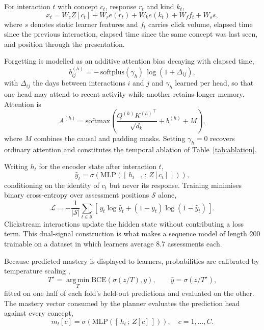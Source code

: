 \documentclass[conference]{IEEEtran}
\begin{document}
For interaction $t$ with concept $c_t$, response $r_t$ and kind $k_t$,
%
\begin{equation}
x_t = W_c Z[c_t] + W_r e(r_t) + W_k e(k_t) + W_f f_t + W_s s,
\label{eq:embedding}
\end{equation}
%
where $s$ denotes static learner features and $f_t$ carries click volume, elapsed time
since the previous interaction, elapsed time since the same concept was last seen, and
position through the presentation.

Forgetting is modelled as an additive attention bias decaying with elapsed time,
%
\begin{equation}
b^{(h)}_{ij} = -\,\mathrm{softplus}(\gamma_h)\,\log(1 + \Delta_{ij}),
\label{eq:decay}
\end{equation}
%
with $\Delta_{ij}$ the days between interactions $i$ and $j$ and $\gamma_h$ learned per
head, so that one head may attend to recent activity while another retains longer
memory. Attention is
%
\begin{equation}
A^{(h)} = \mathrm{softmax}\!\left(\frac{Q^{(h)}{K^{(h)}}^{\top}}{\sqrt{d_k}} + b^{(h)} + M\right),
\label{eq:attention}
\end{equation}
%
where $M$ combines the causal and padding masks. Setting $\gamma_h = 0$ recovers ordinary
attention and constitutes the temporal ablation of Table~\ref{tab:ablation}.

Writing $h_t$ for the encoder state after interaction $t$,
%
\begin{equation}
\hat{y}_t = \sigma\!\left(\mathrm{MLP}\!\left([\,h_{t-1}\,;\,Z[c_t]\,]\right)\right),
\label{eq:prediction}
\end{equation}
%
conditioning on the identity of $c_t$ but never its response. Training minimises binary
cross-entropy over assessment positions $\mathcal{S}$ alone,
%
\begin{equation}
\mathcal{L} = -\frac{1}{|\mathcal{S}|}\sum_{t \in \mathcal{S}} \left[\, y_t \log \hat{y}_t + (1 - y_t)\log(1 - \hat{y}_t)\,\right].
\label{eq:loss}
\end{equation}
%
Clickstream interactions update the hidden state without contributing a loss term. This
dual-signal construction is what makes a sequence model of length 200 trainable on a
dataset in which learners average 8.7 assessments each.

Because predicted mastery is displayed to learners, probabilities are calibrated by
temperature scaling \cite{guo2017calibration},
%
\begin{equation}
T^\star = \operatorname*{arg\,min}_{T} \mathrm{BCE}\!\left(\sigma(z/T), y\right), \qquad \hat{y} = \sigma(z/T^\star),
\label{eq:temperature}
\end{equation}
%
fitted on one half of each fold's held-out predictions and evaluated on the other. The
mastery vector consumed by the planner evaluates the prediction head against every
concept,
%
\begin{equation}
m_t[c] = \sigma\!\left(\mathrm{MLP}\!\left([\,h_t\,;\,Z[c]\,]\right)\right), \quad c = 1,\dots,C.
\label{eq:mastery}
\end{equation}
\end{document}
